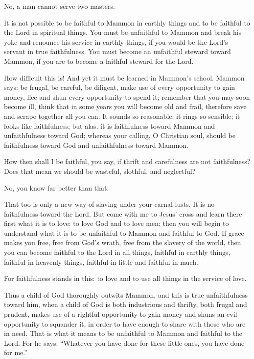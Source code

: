 No, a man cannot serve two masters.

It is not possible to be faithful to Mammon in earthly things and to be faithful to the Lord in spiritual things. You must be unfaithful to Mammon and break his yoke and renounce his service in earthly things, if you would be the Lord’s servant in true faithfulness. You must become an unfaithful steward toward Mammon, if you are to become a faithful steward for the Lord.

How difficult this is! And yet it must be learned in Mammon’s school. Mammon says: be frugal, be careful, be diligent, make use of every opportunity to gain money, flee and shun every opportunity to spend it; remember that you may soon become ill, think that in some years you will become old and frail, therefore save and scrape together all you can. It sounds so reasonable; it rings so sensible; it looks like faithfulness; but alas, it is faithfulness toward Mammon and unfaithfulness toward God; whereas your calling, O Christian soul, should be faithfulness toward God and unfaithfulness toward Mammon.

How then shall I be faithful, you say, if thrift and carefulness are not faithfulness? Does that mean we should be wasteful, slothful, and neglectful? 

No, you know far better than that. 

That too is only a new way of slaving under your carnal lusts. It is no faithfulness toward the Lord. But come with me to Jesus’ cross and learn there first what it is to love: to love God and to love men; then you will begin to understand what it is to be unfaithful to Mammon and faithful to God. If grace makes you free, free from God’s wrath, free from the slavery of the world, then you can become faithful to the Lord in all things, faithful in earthly things, faithful in heavenly things, faithful in little and faithful in much. 

For faithfulness stands in this: to love and to use all things in the service of love.

Thus a child of God thoroughly outwits Mammon, and this is true unfaithfulness toward him, when a child of God is both industrious and thrifty, both frugal and prudent, makes use of a rightful opportunity to gain money and shuns an evil opportunity to squander it, in order to have enough to share with those who are in need. That is what it means to be unfaithful to Mammon and faithful to the Lord. For he says: “Whatever you have done for these little ones, you have done for me.”


